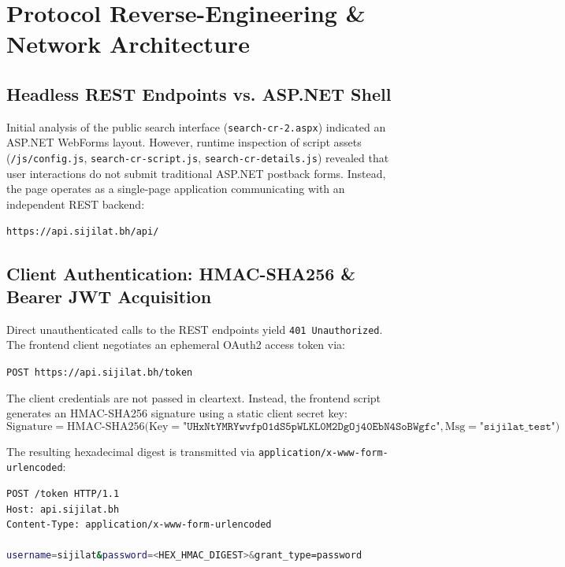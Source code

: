 \documentclass[11pt,a4paper]{article}
\begin{document}
\section{\color{techprimary}Protocol Reverse-Engineering \& Network Architecture}

\subsection{Headless REST Endpoints vs. ASP.NET Shell}
Initial analysis of the public search interface (\texttt{search-cr-2.aspx}) indicated an ASP.NET WebForms layout. However, runtime inspection of script assets (\texttt{/js/config.js}, \texttt{search-cr-script.js}, \texttt{search-cr-details.js}) revealed that user interactions do not submit traditional ASP.NET postback forms. Instead, the page operates as a single-page application communicating with an independent REST backend:
\begin{center}
    \texttt{https://api.sijilat.bh/api/}
\end{center}

\subsection{Client Authentication: HMAC-SHA256 \& Bearer JWT Acquisition}
Direct unauthenticated calls to the REST endpoints yield \texttt{401 Unauthorized}. The frontend client negotiates an ephemeral OAuth2 access token via:
\begin{center}
    \texttt{POST https://api.sijilat.bh/token}
\end{center}

The client credentials are not passed in cleartext. Instead, the frontend script generates an HMAC-SHA256 signature using a static client secret key:
\begin{equation}
\text{Signature} = \text{HMAC-SHA256}\Big(\text{Key} = \texttt{"UHxNtYMRYwvfpO1dS5pWLKL0M2DgOj40EbN4SoBWgfc"}, \text{Msg} = \texttt{"sijilat\_test"}\Big)
\end{equation}

The resulting hexadecimal digest is transmitted via \texttt{application/x-www-form-urlencoded}:
\begin{lstlisting}[language=bash]
POST /token HTTP/1.1
Host: api.sijilat.bh
Content-Type: application/x-www-form-urlencoded

username=sijilat&password=<HEX_HMAC_DIGEST>&grant_type=password
\end{lstlisting}
\end{document}
